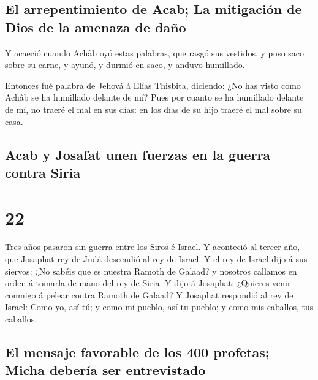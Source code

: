 \hypertarget{el-arrepentimiento-de-acab-la-mitigaciuxf3n-de-dios-de-la-amenaza-de-dauxf1o}{%
\subsection{El arrepentimiento de Acab; La mitigación de Dios de la
amenaza de
daño}\label{el-arrepentimiento-de-acab-la-mitigaciuxf3n-de-dios-de-la-amenaza-de-dauxf1o}}

 Y acaeció cuando Achâb oyó estas palabras, que rasgó sus
vestidos, y puso saco sobre su carne, y ayunó, y durmió en saco, y
anduvo humillado.

 Entonces fué palabra de Jehová á Elías Thisbita, diciendo:
 ¿No has visto como Achâb se ha humillado delante de mí?
Pues por cuanto se ha humillado delante de mí, no traeré el mal en sus
días: en los días de su hijo traeré el mal sobre su casa.

\hypertarget{acab-y-josafat-unen-fuerzas-en-la-guerra-contra-siria}{%
\subsection{Acab y Josafat unen fuerzas en la guerra contra
Siria}\label{acab-y-josafat-unen-fuerzas-en-la-guerra-contra-siria}}

\hypertarget{section-21}{%
\section{22}\label{section-21}}

 Tres años pasaron sin guerra entre los Siros é Israel.
 Y aconteció al tercer año, que Josaphat rey de Judá
descendió al rey de Israel.  Y el rey de Israel dijo á sus
siervos: ¿No sabéis que es nuestra Ramoth de Galaad? y nosotros callamos
en orden á tomarla de mano del rey de Siria.  Y dijo á
Josaphat: ¿Quieres venir conmigo á pelear contra Ramoth de Galaad? Y
Josaphat respondió al rey de Israel: Como yo, así tú; y como mi pueblo,
así tu pueblo; y como mis caballos, tus caballos.

\hypertarget{el-mensaje-favorable-de-los-400-profetas-micha-deberuxeda-ser-entrevistado}{%
\subsection{El mensaje favorable de los 400 profetas; Micha debería ser
entrevistado}\label{el-mensaje-favorable-de-los-400-profetas-micha-deberuxeda-ser-entrevistado}}

